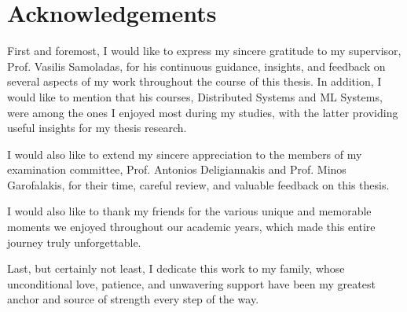 \chapter*{Acknowledgements}

\vspace{0.3cm}
First and foremost, I would like to express my sincere gratitude to my supervisor, Prof. Vasilis Samoladas, for his continuous guidance, insights, and feedback on several aspects of my work throughout the course of this thesis. In addition, I would like to mention that his courses, Distributed Systems and ML Systems, were among the ones I enjoyed most during my studies, with the latter providing useful insights for my thesis research.
 
I would also like to extend my sincere appreciation to the members of my examination committee, Prof. Antonios Deligiannakis and Prof. Minos Garofalakis, for their time, careful review, and valuable feedback on this thesis.
 
I would also like to thank my friends for the various unique and memorable moments we enjoyed throughout our academic years, which made this entire journey truly unforgettable.
 
Last, but certainly not least, I dedicate this work to my family, whose unconditional love, patience, and unwavering support have been my greatest anchor and source of strength every step of the way.
